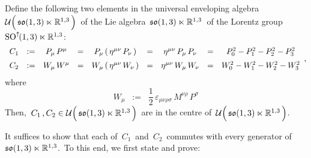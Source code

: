 \vskip 0.5cm
\begin{theorem}
\mbox{}
\vskip 0.1cm
\noindent
Define the following two elements in the universal enveloping algebra
\,$\mathcal{U}\!\left(\,\overset{{\color{white}.}}{\so(1,3)\ltimes\Re^{1,3}}\,\right)$\,
of the Lie algebra
\,$\mathfrak{so}(1,3)\ltimes\mathbb{R}^{1,3}$\,
of the Lorentz group
\,$\textnormal{SO}^{\uparrow\!}(1,3)\ltimes\mathbb{R}^{1,3}$:\,
\begin{equation*}
\begin{array}{ccccccccc}
C_{1}
& := &
	P_{\mu}\,P^{\mu}
& = &
	P_{\mu}\left(\,\eta^{\mu\nu}\,P_{\nu}\,\right)
& = &
	\eta^{\mu\nu}\,P_{\mu}\,P_{\nu}
& = &
	P_{0}^{2} - P_{1}^{2} - P_{2}^{2} - P_{3}^{2}
\\
C_{2}
& \overset{{\color{white}\textnormal{\normalsize$1$}}}{:=} &
	W_{\mu}\,W^{\mu}
& = &
	W_{\mu}\left(\,\eta^{\mu\nu}\,W_{\nu}\,\right)
& = &
	\eta^{\mu\nu}\,W_{\mu}\,W_{\nu}
& = &
	W_{0}^{2} - W_{1}^{2} - W_{2}^{2} - W_{3}^{2}
\end{array},
\end{equation*}
where
\begin{equation*}
W_{\mu}
\;\; := \;\;
	\dfrac{1}{2}\,\varepsilon_{\mu\nu\rho\sigma}\,M^{\nu\rho}\,P^{\sigma}
\end{equation*}
Then,
\,$C_{1}\,, C_{2} \in \mathcal{U}\!\left(\,\overset{{\color{white}.}}{\so(1,3)\ltimes\Re^{1,3}}\,\right)$\,
are in the centre of
\,$\mathcal{U}\!\left(\,\overset{{\color{white}.}}{\so(1,3)\ltimes\Re^{1,3}}\,\right)$.\,
\end{theorem}
\proof
It suffices to show that each of \,$C_{1}$\, and \,$C_{2}$\, commutes with every generator of
\,$\mathfrak{so}(1,3)\ltimes\mathbb{R}^{1,3}$.\,
To this end, we first state and prove:

